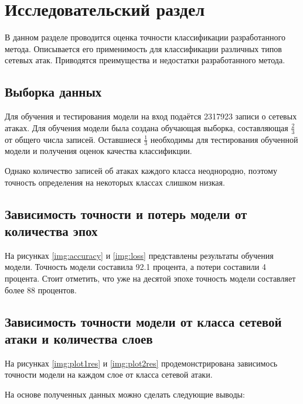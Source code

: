 \chapter{Исследовательский раздел}
В данном разделе проводится оценка точности классификации разработанного метода. Описывается его применимость для классификации различных типов сетевых атак. Приводятся преимущества и недостатки разработанного метода.

\section{Выборка данных}
Для обучения и тестирования модели на вход подаётся 2317923 записи о сетевых атаках.
Для обучения модели была создана обучающая выборка,
составляющая $\frac{2}{3}$ от общего числа записей. Оставшиеся $\frac{1}{3}$ необходимы
для тестирования обученной модели и получения оценок качества классификции.

Однако количество записей об атаках каждого класса неоднородно, поэтому
точность определения на некоторых классах слишком низкая.

\section{Зависимость точности и потерь модели от количества эпох}

На рисунках \ref*{img:accuracy} и \ref*{img:loss} представлены результаты обучения модели. Точность модели составила 92.1 процента, а потери составили 4 процента. Стоит
отметить, что уже на десятой эпохе точность модели составляет более 88 процентов.


\section{Зависимость точности модели от класса сетевой атаки и количества слоев}
На рисунках \ref*{img:plot1res} и \ref*{img:plot2res} продемонстрирована зависимось точности модели на каждом слое от класса сетевой атаки.




На основе полученных данных можно сделать следующие выводы:

